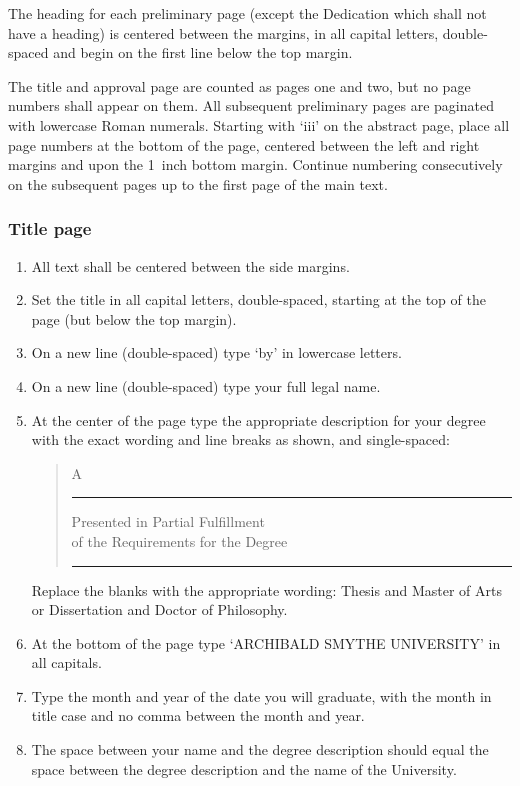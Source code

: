     The heading for each preliminary page (except the Dedication which shall
not have a heading) is centered between the margins, in all capital letters,
double-spaced and begin on the first line below the top margin.

    The title and approval page are counted as pages one and two, but
no page numbers shall appear on them. All subsequent preliminary pages are 
paginated with lowercase Roman numerals. Starting with `iii' on the abstract
page, place all page numbers at the bottom of the page, centered between
the left and right margins and upon the 1~inch bottom margin. Continue
numbering consecutively on the subsequent pages up to the first page
of the main text. 

\subsubsection{Title page}

\begin{enumerate}
\item All text shall be centered between the side margins.

\item Set the title in all capital letters, double-spaced, 
starting at the top of the page (but below the top margin).
\item On a new line (double-spaced) type `by' in lowercase letters.
\item On a new line (double-spaced) type your full legal name.
\item At the center of the page type the appropriate description for
your degree with the exact wording and line breaks as shown, and single-spaced:
\begin{quote} \centering
A \rule{1in}{0.4pt} Presented in Partial Fulfillment \\
of the Requirements for the Degree \\
\rule{2in}{0.4pt}
\end{quote}
    Replace the blanks with the appropriate wording: Thesis and Master
of Arts or Dissertation and Doctor of Philosophy.
\item At the bottom of the page type `ARCHIBALD SMYTHE UNIVERSITY' in all 
     capitals.
\item Type the month and year of the date you will graduate, with the
month in title case and no comma between the month and year.
\item The space between your name and the degree description should equal
the space between the degree description and the name of the University.
\end{enumerate}


